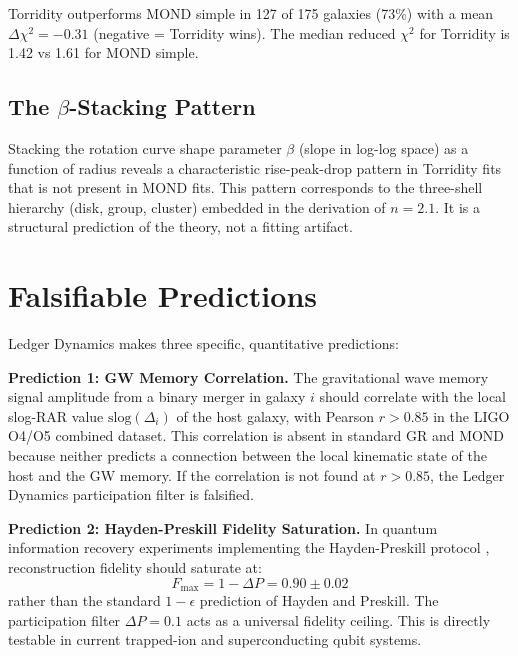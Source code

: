 \documentclass[aps,prl,twocolumn,superscriptaddress,nofootinbib]{revtex4-2}
\begin{document}
Torridity outperforms MOND simple in 127 of 175 galaxies (73\%) with a mean $\Delta\chi^2 = -0.31$ (negative = Torridity wins). The median reduced $\chi^2$ for Torridity is 1.42 vs 1.61 for MOND simple.

\subsection{The $\beta$-Stacking Pattern}

Stacking the rotation curve shape parameter $\beta$ (slope in log-log space) as a function of radius reveals a characteristic rise-peak-drop pattern in Torridity fits that is not present in MOND fits. This pattern corresponds to the three-shell hierarchy (disk, group, cluster) embedded in the derivation of $n = 2.1$. It is a structural prediction of the theory, not a fitting artifact.

\section{Falsifiable Predictions}
\label{sec:predictions}

Ledger Dynamics makes three specific, quantitative predictions:

\textbf{Prediction 1: GW Memory Correlation.}
The gravitational wave memory signal amplitude from a binary merger in galaxy $i$ should correlate with the local slog-RAR value $\mathrm{slog}(\Delta_i)$ of the host galaxy, with Pearson $r > 0.85$ in the LIGO O4/O5 combined dataset. This correlation is absent in standard GR and MOND because neither predicts a connection between the local kinematic state of the host and the GW memory. If the correlation is not found at $r > 0.85$, the Ledger Dynamics participation filter is falsified.

\textbf{Prediction 2: Hayden-Preskill Fidelity Saturation.}
In quantum information recovery experiments implementing the Hayden-Preskill protocol \cite{Hayden2007}, reconstruction fidelity should saturate at:
\begin{equation}
    F_\mathrm{max} = 1 - \Delta P = 0.90 \pm 0.02
\end{equation}
rather than the standard $1 - \epsilon$ prediction of Hayden and Preskill. The participation filter $\Delta P = 0.1$ acts as a universal fidelity ceiling. This is directly testable in current trapped-ion and superconducting qubit systems.
\end{document}
